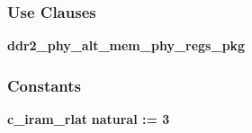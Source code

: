 \subsubsection*{Use Clauses}
 \begin{DoxyCompactItemize}
\item 
{\bf ddr2\+\_\+phy\+\_\+alt\+\_\+mem\+\_\+phy\+\_\+regs\+\_\+pkg}   
\end{DoxyCompactItemize}
\subsubsection*{Constants}
 \begin{DoxyCompactItemize}
\item 
{\bf c\+\_\+iram\+\_\+rlat} {\bfseries \textcolor{comment}{natural}\textcolor{vhdlchar}{ }\textcolor{vhdlchar}{ }\textcolor{vhdlchar}{\+:}\textcolor{vhdlchar}{=}\textcolor{vhdlchar}{ }\textcolor{vhdlchar}{ } \textcolor{vhdldigit}{3} \textcolor{vhdlchar}{ }} 
\item 

\end{DoxyCompactItemize}
